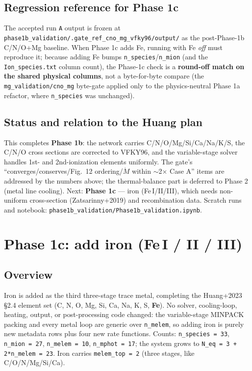 \documentclass[english,a4paper]{kiseon_memo}
\begin{document}
\subsection{Regression reference for Phase 1c}

The accepted run \texttt{A} output is frozen at
\texttt{phase1b\_validation/.gate\_ref\_cno\_mg\_vfky96/output/} as the
post-Phase-1b C/N/O$+$Mg baseline. When Phase 1c adds Fe, running with Fe
\emph{off} must reproduce it; because adding Fe bumps \verb|n_species|/\verb|n_mion|
(and the \texttt{Ion\_species.txt} column count), the Phase-1c check is a
\textbf{round-off match on the shared physical columns}, not a byte-for-byte
compare (the \texttt{mg\_validation/cno\_mg} byte-gate applied only to the
physics-neutral Phase 1a refactor, where \verb|n_species| was unchanged).

\subsection{Status and relation to the Huang plan}

This completes \textbf{Phase 1b}: the network carries C/N/O/Mg/Si/Ca/Na/K/S, the
C/N/O cross sections are corrected to VFKY96, and the variable-stage solver
handles 1st- and 2nd-ionization elements uniformly. The gate's
``converges/conserves/Fig.~12 ordering/$\dot M$ within $\sim$2$\times$ Case A''
items are addressed by the numbers above; the thermal-balance part is deferred to
Phase 2 (metal line cooling). Next: \textbf{Phase 1c} --- iron (Fe\,I/II/III),
which needs non-uniform cross-section (Zatsarinny+2019) and recombination data.
Scratch runs and notebook: \texttt{phase1b\_validation/Phase1b\_validation.ipynb}.

\section{Phase 1c: add iron (Fe\,I / II / III)}

\subsection{Overview}

Iron is added as the third three-stage trace metal, completing the Huang+2023
\S2.4 element set (C, N, O, Mg, Si, Ca, Na, K, S, \textbf{Fe}). No solver,
cooling-loop, heating, output, or post-processing code changed: the
variable-stage MINPACK packing and every metal loop are generic over
\verb|n_melem|, so adding iron is purely new metadata rows plus four new rate
functions. Counts: \verb|n_species = 33|, \verb|n_mion = 27|,
\verb|n_melem = 10|, \verb|n_mphot = 17|; the system grows to
\verb|N_eq = 3 + 2*n_melem = 23|. Iron carries \verb|melem_top = 2| (three
stages, like C/O/N/Mg/Si/Ca).
\end{document}
